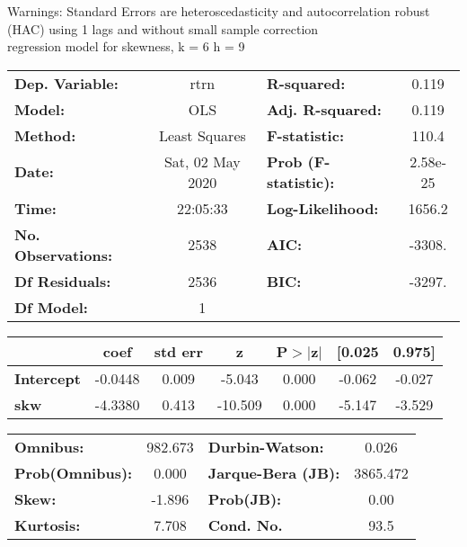 Warnings: \newline
 [1] Standard Errors are heteroscedasticity and autocorrelation robust (HAC) using 1 lags and without small sample correction\\ 

regression model for skewness, k = 6 h = 9\begin{center}
\begin{tabular}{lclc}
\toprule
\textbf{Dep. Variable:}    &       rtrn       & \textbf{  R-squared:         } &     0.119   \\
\textbf{Model:}            &       OLS        & \textbf{  Adj. R-squared:    } &     0.119   \\
\textbf{Method:}           &  Least Squares   & \textbf{  F-statistic:       } &     110.4   \\
\textbf{Date:}             & Sat, 02 May 2020 & \textbf{  Prob (F-statistic):} &  2.58e-25   \\
\textbf{Time:}             &     22:05:33     & \textbf{  Log-Likelihood:    } &    1656.2   \\
\textbf{No. Observations:} &        2538      & \textbf{  AIC:               } &    -3308.   \\
\textbf{Df Residuals:}     &        2536      & \textbf{  BIC:               } &    -3297.   \\
\textbf{Df Model:}         &           1      & \textbf{                     } &             \\
\bottomrule
\end{tabular}
\begin{tabular}{lcccccc}
                   & \textbf{coef} & \textbf{std err} & \textbf{z} & \textbf{P$> |$z$|$} & \textbf{[0.025} & \textbf{0.975]}  \\
\midrule
\textbf{Intercept} &      -0.0448  &        0.009     &    -5.043  &         0.000        &       -0.062    &       -0.027     \\
\textbf{skw}       &      -4.3380  &        0.413     &   -10.509  &         0.000        &       -5.147    &       -3.529     \\
\bottomrule
\end{tabular}
\begin{tabular}{lclc}
\textbf{Omnibus:}       & 982.673 & \textbf{  Durbin-Watson:     } &    0.026  \\
\textbf{Prob(Omnibus):} &   0.000 & \textbf{  Jarque-Bera (JB):  } & 3865.472  \\
\textbf{Skew:}          &  -1.896 & \textbf{  Prob(JB):          } &     0.00  \\
\textbf{Kurtosis:}      &   7.708 & \textbf{  Cond. No.          } &     93.5  \\
\bottomrule
\end{tabular}
\end{center}

